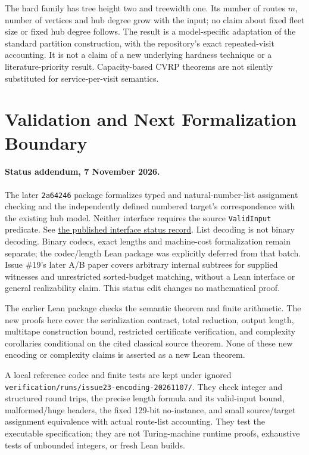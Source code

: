 \documentclass[11pt]{article}
\theoremstyle{remark}
\newcommand{\code}[1]{\nolinkurl{#1}}
\begin{document}
The hard family has tree height two and treewidth one. Its number of routes
$m$, number of vertices and hub degree grow with the input; no claim about
fixed fleet size or fixed hub degree follows. The result is a model-specific
adaptation of the standard partition construction, with the repository's
exact repeated-visit accounting. It is not a claim of a new underlying
hardness technique or a literature-priority result. Capacity-based CVRP
theorems are not silently substituted for service-per-visit semantics.

\section{Validation and Next Formalization Boundary}
\label{sec:validation}

\paragraph{Status addendum, 7 November 2026.}
The later \code{2a64246} package formalizes typed and natural-number-list
assignment checking and the independently defined numbered target's
correspondence with the existing hub model. Neither interface requires
the source \code{ValidInput} predicate. See \href{https://github.com/huam54925-cpu/uav-routing-certification/blob/2a64246acd8e5fe323e8d6bbe3fd3399cdedd3df/docs/HUB_INTERFACES_STATUS.md}{the published interface status record}.
List decoding is not binary decoding. Binary codecs, exact lengths and
machine-cost formalization remain separate; the codec/length Lean package
was explicitly deferred from that batch. Issue \#19's later A/B paper
covers arbitrary internal subtrees for supplied witnesses and unrestricted
sorted-budget matching, without a Lean interface or general realizability
claim. This status edit changes no mathematical proof.

The earlier Lean package checks the semantic theorem and finite arithmetic.
The new proofs here cover the serialization contract, total reduction,
output length, multitape construction bound, restricted certificate
verification, and complexity corollaries conditional on the cited classical
source theorem. None of these new encoding or complexity claims is asserted
as a new Lean theorem.

A local reference codec and finite tests are kept under ignored
\code{verification/runs/issue23-encoding-20261107/}. They check integer and
structured round trips, the precise length formula and its valid-input
bound, malformed/huge headers, the fixed 129-bit no-instance, and small
source/target assignment equivalence with actual route-list accounting.
They test the executable specification; they are not Turing-machine runtime
proofs, exhaustive tests of unbounded integers, or fresh Lean builds.
\end{document}
